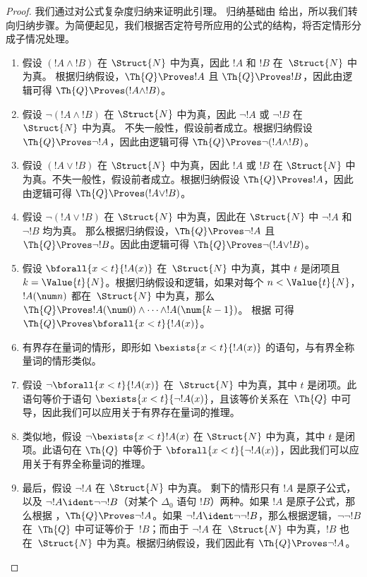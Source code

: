 \documentclass[../../../include/open-logic-section]{subfiles}
\begin{document}
\begin{proof}
我们通过对公式复杂度归纳来证明此引理。
%
归纳基础由  给出，所以我们转向归纳步骤。为简便起见，我们根据否定符号所应用的公式的结构，将否定情形分成子情况处理。

\begin{enumerate}
\item 假设 $(!A \land !B)$ 在 $\Struct{N}$ 中为真，因此 $!A$ 和 $!B$ 在~$\Struct{N}$ 中为真。
根据归纳假设，$\Th{Q} \Proves !A$ 且 $\Th{Q} \Proves !B$，因此由逻辑可得 $\Th{Q} \Proves (!A \land !B)$。
%
\item 假设 $\lnot (!A \land !B)$ 在 $\Struct{N}$ 中为真，因此 $\lnot !A$ 或 $\lnot !B$ 在 $\Struct{N}$ 中为真。
不失一般性，假设前者成立。根据归纳假设 $\Th{Q} \Proves \lnot !A$，因此由逻辑可得 $\Th{Q} \Proves \lnot (!A \land !B)$。
%
\item 假设 $(!A \lor !B)$ 在 $\Struct{N}$ 中为真，因此 $!A$ 或 $!B$ 在 $\Struct{N}$ 中为真。不失一般性，假设前者成立。根据归纳假设 $\Th{Q} \Proves !A$，因此由逻辑可得 $\Th{Q} \Proves (!A \lor !B)$。
%
\item 假设 $\lnot(!A \lor !B)$ 在 $\Struct{N}$ 中为真，因此在 $\Struct{N}$ 中 $\lnot !A$ 和 $\lnot !B$ 均为真。
那么根据归纳假设，$\Th{Q} \Proves \lnot !A$ 且 $\Th{Q} \Proves \lnot !B$。因此由逻辑可得 $\Th{Q} \Proves \lnot(!A \lor !B)$。
%
\item 假设 $\bforall{x<t}{!A(x)}$ 在~$\Struct{N}$ 中为真，其中 $t$ 是闭项且 $k=\Value{t}{N}$。根据归纳假设和逻辑，如果对每个 $n < \Value{t}{N}$，$!A(\num n)$ 都在~$\Struct{N}$ 中为真，那么 $\Th{Q} \Proves
!A(\num 0) \land \dots \land !A(\num{k-1})$。
根据  可得 $\Th{Q} \Proves \bforall{x<t}{!A(x)}$。
%
\item 有界存在量词的情形，即形如 $\bexists{x < t}{!A(x)}$ 的语句，与有界全称量词的情形类似。
%
\item 假设 $\lnot \bforall{x<t}{!A(x)}$ 在~$\Struct{N}$ 中为真，其中 $t$ 是闭项。此语句等价于语句 $\bexists{x<t}{\lnot !A(x)}$，且该等价关系在~$\Th{Q}$ 中可导，因此我们可以应用关于有界存在量词的推理。
%
\item 类似地，假设 $\lnot \bexists{x<t}!A(x)$ 在 $\Struct{N}$ 中为真，其中 $t$ 是闭项。此语句在 $\Th{Q}$ 中等价于 $\bforall{x<t}{\lnot!A(x)}$，因此我们可以应用关于有界全称量词的推理。
%
\item 最后，假设 $\lnot !A$ 在 $\Struct{N}$ 中为真。
剩下的情形只有 $!A$ 是原子公式，以及 $\lnot !A \ident \lnot\lnot !B$（对某个 $\Delta_0$ 语句 $!B$）两种。如果 $!A$ 是原子公式，那么根据 ，$\Th{Q} \Proves \lnot !A$。如果 $\lnot !A \ident \lnot\lnot !B$，那么根据逻辑，$\lnot\lnot !B$ 在~$\Th{Q}$ 中可证等价于~$!B$；而由于 $\lnot !A$ 在~$\Struct{N}$ 中为真，$!B$ 也在~$\Struct{N}$ 中为真。根据归纳假设，我们因此有 $\Th{Q} \Proves \lnot !A$。
\end{enumerate}
\end{proof}
\end{document}
